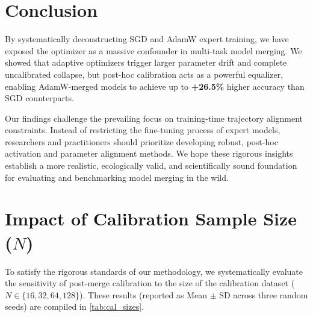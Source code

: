 \documentclass{article}
\theoremstyle{plain}
\theoremstyle{definition}
\theoremstyle{remark}
\begin{document}
\section{Conclusion}
\label{sec:conclusion}
By systematically deconstructing SGD and AdamW expert training, we have exposed the optimizer as a massive confounder in multi-task model merging. We showed that adaptive optimizers trigger larger parameter drift and complete uncalibrated collapse, but post-hoc calibration acts as a powerful equalizer, enabling AdamW-merged models to achieve up to \textbf{+26.5\%} higher accuracy than SGD counterparts.

Our findings challenge the prevailing focus on training-time trajectory alignment constraints. Instead of restricting the fine-tuning process of expert models, researchers and practitioners should prioritize developing robust, post-hoc activation and parameter alignment methods. We hope these rigorous insights establish a more realistic, ecologically valid, and scientifically sound foundation for evaluating and benchmarking model merging in the wild.




\clearpage
\appendix
\section{Impact of Calibration Sample Size ($N$)}
\label{sec:app_cal_sizes}
To satisfy the rigorous standards of our methodology, we systematically evaluate the sensitivity of post-merge calibration to the size of the calibration dataset ($N \in \{16, 32, 64, 128\}$). These results (reported as Mean $\pm$ SD across three random seeds) are compiled in \cref{tab:cal_sizes}.
\end{document}
